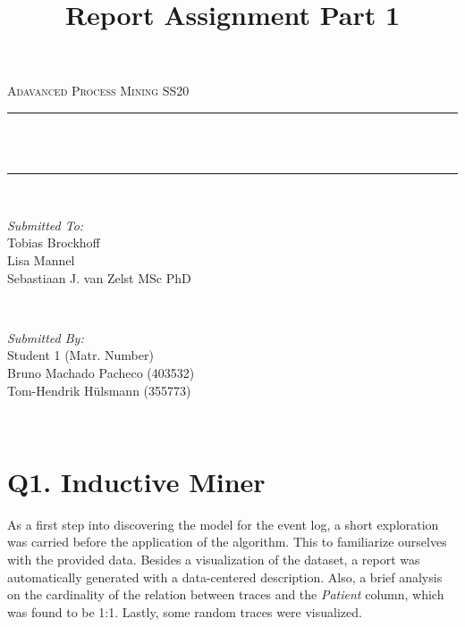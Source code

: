 \documentclass[12pt]{report}
\title{Report Assignment Part 1}
\author{}
\date{}
\makeatletter
\let\thetitle\@title
\makeatother
\begin{document}

\begin{titlepage}
	\centering
    \vspace*{0.5 cm}
  \begin{center}    \textsc{\Large   Adavanced Process Mining SS20}\\[2.0 cm]	\end{center}
	\rule{\linewidth}{0.2 mm} \\[0.4 cm]
	{ \huge \bfseries \thetitle}\\
	\rule{\linewidth}{0.2 mm} \\[1.5 cm]
	
  \begin{minipage}{0.48\textwidth}
    \begin{flushleft} \large
      \emph{Submitted To:}\\
      Tobias Brockhoff\\
      Lisa Mannel\\
      Sebastiaan J. van Zelst MSc PhD\\
    \end{flushleft}
  \end{minipage}~
  \begin{minipage}{0.48\textwidth}
    \begin{flushright} \large
			\emph{Submitted By:} \\
      Student 1 (Matr. Number) \\
      Bruno Machado Pacheco (403532)  \\
      Tom-Hendrik Hülsmann (355773)
		\end{flushright}
	\end{minipage}\\[2 cm]
	
\end{titlepage}


\renewcommand{\thesection}{\arabic{section}}

\section{Q1. Inductive Miner}

As a first step into discovering the model for the event log, a short exploration was carried before the application of the algorithm. This to familiarize ourselves with the provided data. Besides a visualization of the dataset, a report was automatically generated with a data-centered description. Also, a brief analysis on the cardinality of the relation between traces and the \emph{Patient} column, which was found to be 1:1. Lastly, some random traces were visualized.
\end{document}
